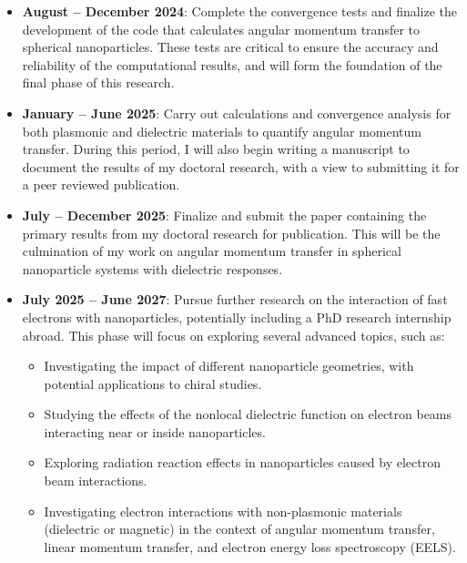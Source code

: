 \begin{itemize}
    \item \textbf{August – December 2024}: Complete the convergence tests and finalize the development of the code that calculates angular momentum transfer to spherical nanoparticles. These tests are critical to ensure the accuracy and reliability of the computational results, and will form the foundation of the final phase of this research.
    
    \item \textbf{January – June 2025}: Carry out calculations and convergence analysis for both plasmonic and dielectric materials to quantify angular momentum transfer. During this period, I will also begin writing a manuscript to document the results of my doctoral research, with a view to submitting it for a peer reviewed publication.
    
    \item \textbf{July – December 2025}: Finalize and submit the paper containing the primary results from my doctoral research for publication. This will be the culmination of my work on angular momentum transfer in spherical nanoparticle systems with dielectric responses.
    
    \item \textbf{July 2025 – June 2027}: Pursue further research on the interaction of fast electrons with nanoparticles, potentially including a PhD research internship abroad. This phase will focus on exploring several advanced topics, such as:
    \begin{itemize}
        \item Investigating the impact of different nanoparticle geometries, with potential applications to chiral studies.
        \item Studying the effects of the nonlocal dielectric function on electron beams interacting near or inside nanoparticles.
        \item Exploring radiation reaction effects in nanoparticles caused by electron beam interactions.
        \item Investigating electron interactions with non-plasmonic materials (dielectric or magnetic) in the context of angular momentum transfer, linear momentum transfer, and electron energy loss spectroscopy (EELS).
    \end{itemize}
\end{itemize}

